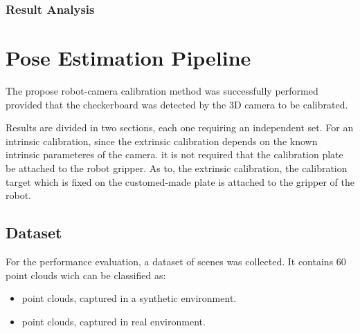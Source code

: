 \subsubsection{Result Analysis}

















\section{Pose Estimation Pipeline}
\iffalse


The propose robot-camera calibration method was successfully performed provided that the checkerboard was detected by the 3D camera to be calibrated.


 Results are divided in two sections, each one requiring an independent set. For an intrinsic calibration, since the extrinsic calibration depends on the known intrinsic parameteres of the camera.  it is not required that the calibration plate be attached to the robot gripper. As to, the extrinsic calibration, the calibration target which is fixed on the customed-made plate is attached to the gripper of the robot.



\subsection{Dataset}

For the performance evaluation, a dataset of scenes was collected. It contains 60 point clouds wich can be classified as:
\begin{itemize}
\item point clouds, captured in a synthetic environment.
\item point clouds, captured in real environment. 
\end{itemize}

